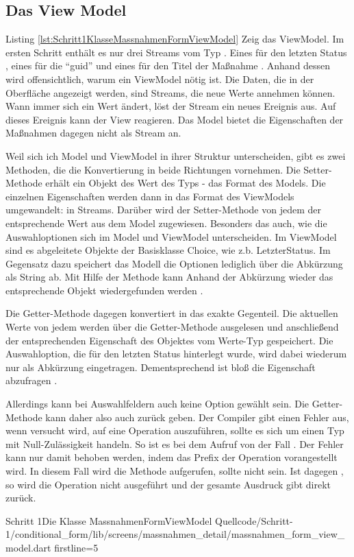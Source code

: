 \subsection{ Das View Model }

Listing \ref{lst:Schritt1KlasseMassnahmenFormViewModel} Zeig das ViewModel.
Im ersten Schritt enthält es nur drei Streams vom Typ .
Eines für den letzten Status , eines für die \enquote{guid}  und eines für den Titel der Maßnahme .
Anhand dessen wird offensichtlich, warum ein ViewModel nötig ist.
Die Daten, die in der Oberfläche angezeigt werden, sind Streams, die neue Werte annehmen können.
Wann immer sich ein Wert ändert, löst der Stream ein neues Ereignis aus.
Auf dieses Ereignis kann der View reagieren.
Das Model bietet die Eigenschaften der Maßnahmen dagegen nicht als Stream an.

Weil sich ich Model und ViewModel in ihrer Struktur unterscheiden, gibt es zwei Methoden, die die Konvertierung in beide Richtungen vornehmen.
Die Setter-Methode   erhält ein Objekt des Wert des Typs  - das Format des Models.
Die einzelnen Eigenschaften werden dann in das Format des ViewModels umgewandelt: in Streams.
Darüber wird der Setter-Methode  von jedem  der entsprechende Wert aus dem Model zugewiesen.
Besonders das auch, wie die Auswahloptionen sich im Model und ViewModel unterscheiden.  Im ViewModel sind es abgeleitete Objekte der Basisklasse Choice, wie z.b. LetzterStatus.  Im Gegensatz dazu speichert das Modell die Optionen lediglich über die Abkürzung als String ab. Mit Hilfe der Methode  kann Anhand der Abkürzung wieder das entsprechende Objekt wiedergefunden werden .

Die Getter-Methode dagegen konvertiert in das exakte Gegenteil.
Die aktuellen Werte von jedem  werden über die Getter-Methode  ausgelesen und anschließend der entsprechenden Eigenschaft des Objektes vom Werte-Typ  gespeichert.
Die Auswahloption, die für den letzten Status hinterlegt wurde, wird dabei wiederum nur als Abkürzung eingetragen.
Dementsprechend ist bloß die Eigenschaft  abzufragen .

Allerdings kann bei Auswahlfeldern auch keine Option gewählt sein.
Die Getter-Methode  kann daher also auch  zurück geben.
Der Compiler gibt einen Fehler aus, wenn versucht wird, auf  eine Operation auszuführen, sollte es sich um einen Typ mit Null-Zulässigkeit handeln.
So ist es bei dem Aufruf von  der Fall .
Der Fehler kann nur damit behoben werden, indem das Prefix   der Operation vorangestellt wird.
In diesem Fall wird die Methode aufgerufen, sollte  nicht  sein.
Ist  dagegen , so wird die Operation nicht ausgeführt und der gesamte Ausdruck gibt direkt  zurück.

\begin{alexlisting}{Schritt 1}{Die Klasse MassnahmenFormViewModel}
  {Quellcode/Schritt-1/conditional_form/lib/screens/massnahmen_detail/massnahmen_form_view_model.dart}
  {firstline=5}
  \label{lst:Schritt1KlasseMassnahmenFormViewModel}
\end{alexlisting}

